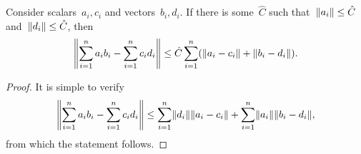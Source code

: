 \begin{lemma}\label{lemma:product}
  Consider scalars~$a_i,c_i$ and vectors~$b_i,d_i$. If there is some~$\hat C$ such that~$\nrm{a_i}\le \hat C$ and~$\norm{d_i}\le \hat C$, then
  \begin{equation*}
    \norm{\sum_{i=1}^n a_ib_i - \sum_{i=1}^n c_id_i}
    \le \hat C\sum_{i=1}^n \Brac{\nrm{a_i-c_i} + \norm{b_i-d_i}}.
  \end{equation*}
\end{lemma}
\begin{proof}
  It is simple to verify
  \begin{equation*}
    \norm{\sum_{i=1}^n a_ib_i - \sum_{i=1}^n c_id_i} \le \sum_{i=1}^n \norm{d_i}\nrm{a_i-c_i} + \sum_{i=1}^n \nrm{a_i}\norm{b_i-d_i},
  \end{equation*}
  from which the statement follows.
\end{proof}